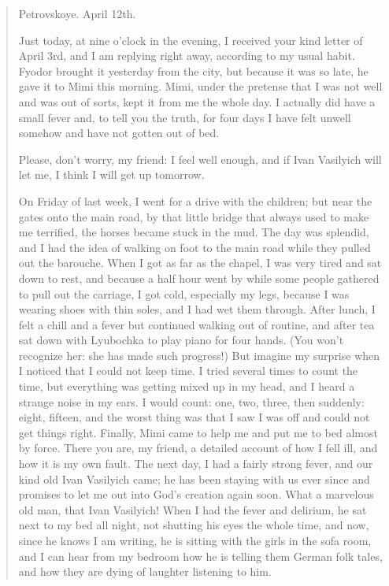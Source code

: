 \begin{quotation}
\begin{flushright}
Petrovskoye. April 12th.
\end{flushright}

Just today, at nine o'clock in the evening, I received your kind letter of April 3rd, and I am replying right away, according to my usual habit. Fyodor brought it yesterday from the city, but because it was so late, he gave it to Mimi this morning. Mimi, under the pretense that I was not well and was out of sorts, kept it from me the whole day. I actually did have a small fever and, to tell you the truth, for four days I have felt unwell somehow and have not gotten out of bed.

Please, don't worry, my friend: I feel well enough, and if Ivan Vasilyich will let me, I think I will get up tomorrow.

On Friday of last week, I went for a drive with the children; but near the gates onto the main road, by that little bridge that always used to make me terrified, the horses became stuck in the mud. The day was splendid, and I had the idea of walking on foot to the main road while they pulled out the barouche. When I got as far as the chapel, I was very tired and sat down to rest, and because a half hour went by while some people gathered to pull out the carriage, I got cold, especially my legs, because I was wearing shoes with thin soles, and I had wet them through. After lunch, I felt a chill and a fever but continued walking out of routine, and after tea sat down with Lyubochka to play piano for four hands. (You won't recognize her: she has made such progress!) But imagine my surprise when I noticed that I could not keep time. I tried several times to count the time, but everything was getting mixed up in my head, and I heard a strange noise in my ears. I would count: one, two, three, then suddenly: eight, fifteen, and the worst thing was that I saw I was off and could not get things right. Finally, Mimi came to help me and put me to bed almost by force. There you are, my friend, a detailed account of how I fell ill, and how it is my own fault. The next day, I had a fairly strong fever, and our kind old Ivan Vasilyich came; he has been staying with us ever since and promises to let me out into God's creation again soon. What a marvelous old man, that Ivan Vasilyich! When I had the fever and delirium, he sat next to my bed all night, not shutting his eyes the whole time, and now, since he knows I am writing, he is sitting with the girls in the sofa room, and I can hear from my bedroom how he is telling them German folk tales, and how they are dying of laughter listening to him.


\end{quotation}
